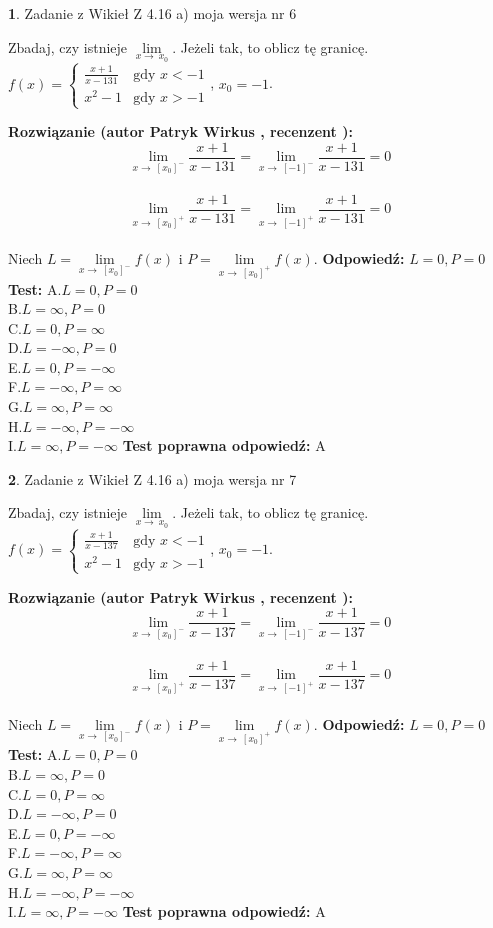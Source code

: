 \documentclass[12pt, a4paper]{article}
\theoremstyle{definition} %
\newtheorem{zad}{}
\newcommand{\zadStart}[1]{\begin{zad}#1\newline}
\newcommand{\zadStop}{\end{zad}}
\newcommand{\rozwStart}[2]{\noindent \textbf{Rozwiązanie (autor #1 , recenzent #2): }\newline}
\newcommand{\rozwStop}{\newline}
\newcommand{\odpStart}{\noindent \textbf{Odpowiedź:}\newline}
\newcommand{\odpStop}{\newline}
\newcommand{\testStart}{\noindent \textbf{Test:}\newline}
\newcommand{\testStop}{\newline}
\newcommand{\kluczStart}{\noindent \textbf{Test poprawna odpowiedź:}\newline}
\newcommand{\kluczStop}{\newline}
\begin{document}
\zadStart{Zadanie z Wikieł Z 4.16 a) moja wersja nr 6}

Zbadaj, czy istnieje $\lim\limits_{x\to\ x_{0}}$. Jeżeli tak, to oblicz tę granicę.\\   $f(x) = \left\{ \begin{array}{ll}
\frac{x+1}{x-131} & \textrm{gdy $x<-1$}\\
x^{2}-1 & \textrm{gdy $x>-1$}
\end{array} \right.$, $x_{0}=-1$.
\zadStop
\rozwStart{Patryk Wirkus}{}
$$\lim\limits_{x\to\ [x_{0}]^{-}}\frac{x+1}{x-131} = \lim\limits_{x\to\ [-1]^{-}}\frac{x+1}{x-131} = 0$$
\\
$$\lim\limits_{x\to\ [x_{0}]^{+}}\frac{x+1}{x-131} = \lim\limits_{x\to\ [-1]^{+}}\frac{x+1}{x-131} = 0$$
\\
Niech $L=\lim\limits_{x\to\ [x_{0}]^{-}}f(x)$ i $P=\lim\limits_{x\to\ [x_{0}]^{+}}f(x)$.
\rozwStop
\odpStart
$L=0, P=0$
\odpStop
\testStart
A.$L=0, P=0$\\ B.$L=\infty, P=0$\\ C.$L=0, P=\infty$\\ D.$L=-\infty, P=0$\\ E.$L=0, P=-\infty$\\
F.$L=-\infty, P=\infty$\\ G.$L=\infty, P=\infty$\\
H.$L=-\infty, P=-\infty$\\
I.$L=\infty, P=-\infty$
\testStop
\kluczStart
A
\kluczStop



\zadStart{Zadanie z Wikieł Z 4.16 a) moja wersja nr 7}

Zbadaj, czy istnieje $\lim\limits_{x\to\ x_{0}}$. Jeżeli tak, to oblicz tę granicę.\\   $f(x) = \left\{ \begin{array}{ll}
\frac{x+1}{x-137} & \textrm{gdy $x<-1$}\\
x^{2}-1 & \textrm{gdy $x>-1$}
\end{array} \right.$, $x_{0}=-1$.
\zadStop
\rozwStart{Patryk Wirkus}{}
$$\lim\limits_{x\to\ [x_{0}]^{-}}\frac{x+1}{x-137} = \lim\limits_{x\to\ [-1]^{-}}\frac{x+1}{x-137} = 0$$
\\
$$\lim\limits_{x\to\ [x_{0}]^{+}}\frac{x+1}{x-137} = \lim\limits_{x\to\ [-1]^{+}}\frac{x+1}{x-137} = 0$$
\\
Niech $L=\lim\limits_{x\to\ [x_{0}]^{-}}f(x)$ i $P=\lim\limits_{x\to\ [x_{0}]^{+}}f(x)$.
\rozwStop
\odpStart
$L=0, P=0$
\odpStop
\testStart
A.$L=0, P=0$\\ B.$L=\infty, P=0$\\ C.$L=0, P=\infty$\\ D.$L=-\infty, P=0$\\ E.$L=0, P=-\infty$\\
F.$L=-\infty, P=\infty$\\ G.$L=\infty, P=\infty$\\
H.$L=-\infty, P=-\infty$\\
I.$L=\infty, P=-\infty$
\testStop
\kluczStart
A
\kluczStop
\end{document}
